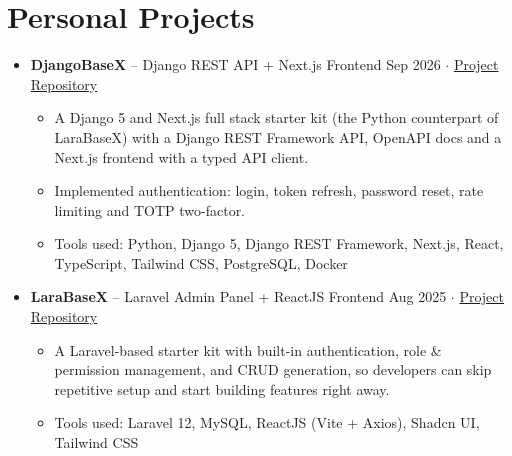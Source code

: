\documentclass[a4paper,11pt]{article}
\begin{document}
\section{\textbf{Personal Projects}}
\begin{itemize}[leftmargin=0.13in]
    \item \textbf{DjangoBaseX} – Django REST API + Next.js Frontend \hfill{Sep 2026 $\cdot$ \href{https://github.com/ayush-sleeping/DjangoBaseX}{{\color{blue}Project Repository}}}
    \begin{itemize}[itemsep=0pt, topsep=0pt]
        \item A Django 5 and Next.js full stack starter kit (the Python counterpart of LaraBaseX) with a Django REST Framework API, OpenAPI docs and a Next.js frontend with a typed API client.
        \item Implemented authentication: login, token refresh, password reset, rate limiting and TOTP two-factor.
        \item Tools used: Python, Django 5, Django REST Framework, Next.js, React, TypeScript, Tailwind CSS, PostgreSQL, Docker
    \end{itemize}

    \item \textbf{LaraBaseX} – Laravel Admin Panel + ReactJS Frontend \hfill{Aug 2025 $\cdot$ \href{https://github.com/ayush-sleeping/LaraBaseX}{{\color{blue}Project Repository}}}
    \begin{itemize}[itemsep=0pt, topsep=0pt]
        \item A Laravel-based starter kit with built-in authentication, role \& permission management, and CRUD generation, so developers can skip repetitive setup and start building features right away.
        \item Tools used: Laravel 12, MySQL, ReactJS (Vite + Axios), Shadcn UI, Tailwind CSS
    \end{itemize}
\end{itemize}

\end{document}
